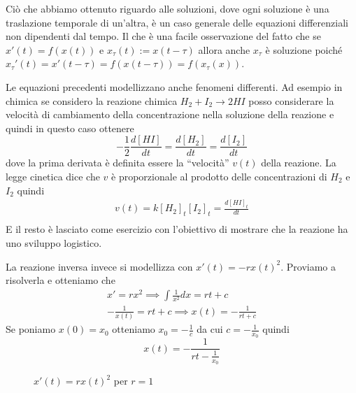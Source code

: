 Ciò che abbiamo ottenuto riguardo alle soluzioni, dove ogni soluzione è una
traslazione temporale di un'altra, è un caso generale delle equazioni
differenziali non dipendenti dal tempo. Il che è una facile osservazione del
fatto che se \(x'(t) = f(x(t))\) e \(x_\tau(t) := x(t - \tau)\) allora anche
\(x_\tau\) è soluzione poiché \(x_\tau'(t) = x'(t-\tau) = f(x(t-\tau)) =
f(x_\tau(x))\).

\begin{example}
    Le equazioni precedenti modellizzano anche fenomeni differenti. Ad esempio in
    chimica se considero la reazione chimica \(H_{2}+I_{2} \to 2HI\) posso
    considerare la velocità di cambiamento della concentrazione nella soluzione
    della reazione e quindi in questo caso ottenere
    \[
        -\frac{1}{2} \frac{d[HI]}{dt} = \frac{d[H_{2}]}{dt} = \frac{d[I_{2}]}{dt}
    \]
    dove la prima derivata è definita essere la ``velocità'' \(v(t)\) della
    reazione. La legge cinetica dice che \(v\) è proporzionale al prodotto delle
    concentrazioni di \(H_{2}\) e \(I_{2}\) quindi 
    \begin{align*}
        v(t) =  k {[H_{2}]}_t {[I_{2}]}_t = \frac{d{[HI]}_t}{dt} \\
    \end{align*}
    E il resto è lasciato come esercizio
    con l'obiettivo di mostrare che la reazione ha uno sviluppo logistico.

La reazione inversa invece si modellizza con \(x'(t) = -r{x(t)}^2\). Proviamo a
risolverla e otteniamo che
\begin{align*}
    x' = rx^2 \implies \int \frac{1}{x^2} dx = rt + c \\
    -\frac{1}{x(t)} = rt + c \implies x(t) = -\frac{1}{rt + c}
\end{align*}
Se poniamo \(x(0) = x_{0}\) otteniamo \(x_{0} = -\frac{1}{c}\) da cui \(c =
-\frac{1}{x_{0}}\) quindi 
\[
    x(t) = -\frac{1}{rt - \frac{1}{x_{0}}}
\]
\begin{figure}[ht]
    \centering
\caption{\(x'(t) = rx{(t)}^2\) per \(r = 1\) }\label{fig:xpisxsr}
\end{figure}
\end{example}


